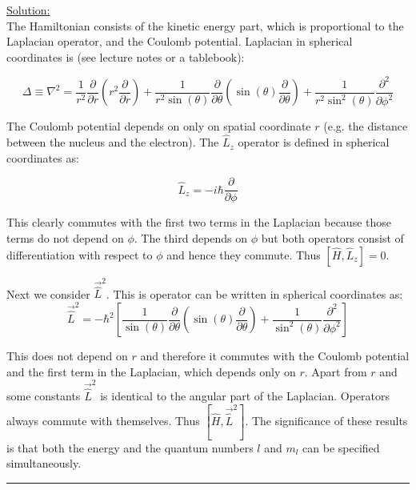 \noindent
\underline{Solution:}\\

The Hamiltonian consists of the kinetic energy part, which is proportional to the Laplacian operator, and the Coulomb potential.
Laplacian in spherical coordinates is (see lecture notes or a tablebook):

$$\Delta\equiv \nabla^2 = \frac{1}{r^2}\frac{\partial}{\partial r}\left(r^2\frac{\partial}{\partial r}\right) + \frac{1}{r^2\sin(\theta)}\frac{\partial}{\partial\theta}\left(\sin(\theta)\frac{\partial}{\partial\theta}\right)
+ \frac{1}{r^2\sin^2(\theta)}\frac{\partial^2}{\partial\phi^2}$$

The Coulomb potential depends on only on spatial coordinate $r$ (e.g. the distance between the nucleus and the electron). The $\hat{L}_z$ operator is defined in spherical coordinates as:

$$\hat{L}_z = -i\hbar\frac{\partial}{\partial\phi}$$

This clearly commutes with the first two terms in the Laplacian because those terms do not depend on $\phi$. The third depends on $\phi$ but both operators consist of differentiation with respect to $\phi$ and hence they commute. Thus $\left[\hat{H},\hat{L}_z\right] = 0$.

Next we consider $\vec{\hat{L}}^2$. This is operator can be written in spherical coordinates as:
$$\vec{\hat{L}}^2 = -\hbar^2\left[\frac{1}{\sin(\theta)}\frac{\partial}{\partial\theta}\left(\sin(\theta)\frac{\partial}{\partial\theta}\right) + \frac{1}{\sin^2(\theta)}\frac{\partial^2}{\partial\phi^2}\right]$$

This does not depend on $r$ and therefore it commutes with the Coulomb potential and the first term in the Laplacian, which depends only on $r$. Apart from $r$ and some constants $\vec{\hat{L}}^2$ is identical to the angular part of the Laplacian. Operators always commute with themselves. Thus $\left[\hat{H},\vec{\hat{L}}^2\right]$. The significance of these results is that both the energy and the quantum numbers $l$ and $m_l$ can be specified simultaneously.

\hrule\vspace{0.5cm}
